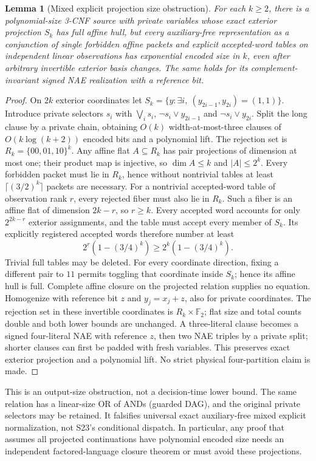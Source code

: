 \documentclass[11pt]{article}
\newtheorem{lemma}[theorem]{Lemma}
\begin{document}
\begin{lemma}[Mixed explicit projection size obstruction]\label{lem:do18-size}
For each $k\ge2$, there is a polynomial-size 3-CNF source with private variables whose exact exterior projection $S_k$ has full affine hull, but every auxiliary-free representation as a conjunction of single forbidden affine packets and explicit accepted-word tables on independent linear observations has exponential encoded size in $k$, even after arbitrary invertible exterior basis changes. The same holds for its complement-invariant signed NAE realization with a reference bit.
\end{lemma}
\begin{proof}
On $2k$ exterior coordinates let $S_k=\{y:\exists i,\ (y_{2i-1},y_{2i})=(1,1)\}$. Introduce private selectors $s_i$ with $\bigvee_i s_i$, $\neg s_i\lor y_{2i-1}$ and $\neg s_i\lor y_{2i}$. Split the long clause by a private chain, obtaining $O(k)$ width-at-most-three clauses of $O(k\log(k+2))$ encoded bits and a polynomial lift. The rejection set is $R_k=\{00,01,10\}^k$. Any affine flat $A\subseteq R_k$ has pair projections of dimension at most one; their product map is injective, so $\dim A\le k$ and $|A|\le2^k$. Every forbidden packet must lie in $R_k$, hence without nontrivial tables at least $\lceil(3/2)^k\rceil$ packets are necessary. For a nontrivial accepted-word table of observation rank $r$, every rejected fiber must also lie in $R_k$. Such a fiber is an affine flat of dimension $2k-r$, so $r\ge k$. Every accepted word accounts for only $2^{2k-r}$ exterior assignments, and the table must accept every member of $S_k$. Its explicitly registered accepted words therefore number at least
\[
2^r(1-(3/4)^k)\ge 2^k(1-(3/4)^k).
\]
Trivial full tables may be deleted. For every coordinate direction, fixing a different pair to $11$ permits toggling that coordinate inside $S_k$; hence its affine hull is full. Complete affine closure on the projected relation supplies no equation. Homogenize with reference bit $z$ and $y_j=x_j+z$, also for private coordinates. The rejection set in these invertible coordinates is $R_k\times\mathbb F_2$; flat size and total counts double and both lower bounds are unchanged. A three-literal clause becomes a signed four-literal NAE with reference $z$, then two NAE triples by a private split; shorter clauses can first be padded with fresh variables. This preserves exact exterior projection and a polynomial lift. No strict physical four-partition claim is made.
\end{proof}
This is an output-size obstruction, not a decision-time lower bound. The same relation has a linear-size OR of ANDs (guarded DAG), and the original private selectors may be retained. It falsifies universal exact auxiliary-free mixed explicit normalization, not S23's conditional dispatch. In particular, any proof that assumes all projected continuations have polynomial encoded size needs an independent factored-language closure theorem or must avoid these projections.
\end{document}
